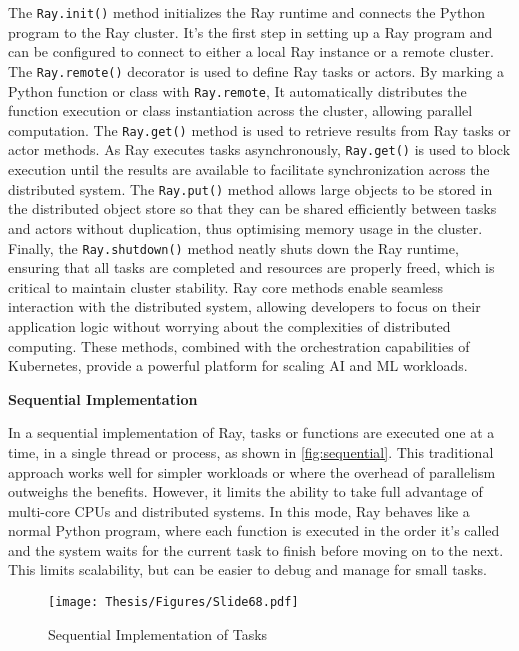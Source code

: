 The \texttt{Ray.init()} method initializes the Ray runtime and connects the Python program to the Ray cluster. It's the first step in setting up a Ray program and can be configured to connect to either a local Ray instance or a remote cluster. The \texttt{Ray.remote()} decorator is used to define Ray tasks or actors. By marking a Python function or class with \texttt{Ray.remote}, It automatically distributes the function execution or class instantiation across the cluster, allowing parallel computation. The \texttt{Ray.get()} method is used to retrieve results from Ray tasks or actor methods. As Ray executes tasks asynchronously, \texttt{Ray.get()} is used to block execution until the results are available to facilitate synchronization across the distributed system. The \texttt{Ray.put()} method allows large objects to be stored in the distributed object store so that they can be shared efficiently between tasks and actors without duplication, thus optimising memory usage in the cluster. Finally, the \texttt{Ray.shutdown()} method neatly shuts down the Ray runtime, ensuring that all tasks are completed and resources are properly freed, which is critical to maintain cluster stability. Ray core methods enable seamless interaction with the distributed system, allowing developers to focus on their application logic without worrying about the complexities of distributed computing. These methods, combined with the orchestration capabilities of Kubernetes, provide a powerful platform for scaling AI and ML workloads. \cite{ray_doc}


\textbf{Sequential Implementation}

In a sequential implementation of Ray, tasks or functions are executed one at a time, in a single thread or process, as shown in \autoref{fig:sequential}. This traditional approach works well for simpler workloads or where the overhead of parallelism outweighs the benefits. However, it limits the ability to take full advantage of multi-core CPUs and distributed systems. In this mode, Ray behaves like a normal Python program, where each function is executed in the order it's called and the system waits for the current task to finish before moving on to the next. This limits scalability, but can be easier to debug and manage for small tasks. \cite{ray_doc}



\begin{figure}[h]
\centering
\texttt{[image: Thesis/Figures/Slide68.pdf]}
\caption{\label{fig:sequential}Sequential Implementation of Tasks \cite{ray_doc}}
\end{figure}



